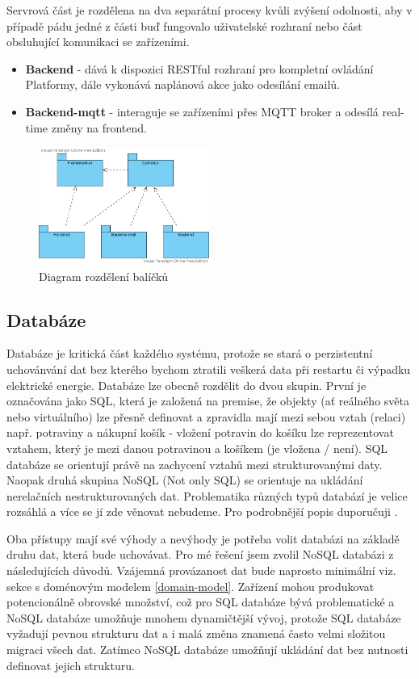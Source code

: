 Servrová část je rozdělena na dva separátní procesy kvůli zvýšení odolnosti, aby v případě pádu jedné z části buď fungovalo uživatelské rozhraní nebo část obsluhující komunikaci se zařízeními.
\begin{itemize}
    \item \textbf{Backend} - dává k dispozici RESTful rozhraní pro kompletní ovládání Platformy, dále vykonává naplánová akce jako odesílání emailů.
    \item \textbf{Backend-mqtt} - interaguje se zařízeními přes MQTT broker a odesílá real-time změny na frontend.
\end{itemize}

\begin{figure}[htbp]
    \label{packages-uml}
    \centering
    \includegraphics[width=0.5\textwidth]{img/packages.pdf}
    \caption{Diagram rozdělení balíčků}
\end{figure}

\subsection{Databáze}
Databáze je kritická část každého systému, protože se stará o perzistentní uchovánvání dat bez kterého bychom ztratili veškerá data při restartu či výpadku elektrické energie. Databáze lze obecně rozdělit do dvou skupin. První je označována jako SQL, která je založená na premise, že objekty (ať reálného světa nebo virtuálního) lze přesně definovat a zpravidla mají mezi sebou vztah (relaci) např. potraviny a nákupní košík - vložení potravin do košíku lze reprezentovat vztahem, který je mezi danou potravinou a košíkem (je vložena / není). SQL databáze se orientují právě na zachycení vztahů mezi strukturovanými daty. Naopak druhá skupina NoSQL (Not only SQL) se orientuje na ukládání nerelačních nestrukturovaných dat. Problematika různých typů databází je velice rozsáhlá a více se jí zde věnovat nebudeme. Pro podrobnější popis duporučuji \cite{sql-and-nosql}.

Oba přístupy mají své výhody a nevýhody je potřeba volit databázi na základě druhu dat, která bude uchovávat. Pro mé řešení jsem zvolil NoSQL databázi z následujících důvodů. Vzájemná provázanost dat bude naprosto minimální viz. sekce s doménovým modelem \ref{domain-model}. Zařízení mohou produkovat potencionálně obrovské množství, což pro SQL databáze bývá problematické a NoSQL databáze umožňuje mnohem dynamičtější vývoj, protože SQL databáze vyžadují pevnou strukturu dat a i malá změna znamená často velmi složitou migraci všech dat. Zatímco NoSQL databáze umožňují ukládání dat bez nutnosti definovat jejich strukturu.

